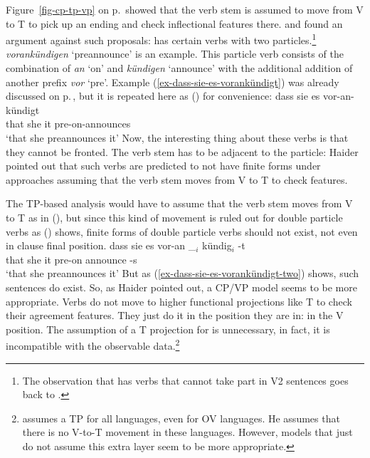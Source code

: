 \largerpage
Figure~\ref{fig-cp-tp-vp} on p.\,\pageref{fig-cp-tp-vp} showed that the verb stem is assumed to move from V to T to
pick up an ending and check inflectional features there. \textcites[]{Haider93a}[--60]{Haider2010a} and \citet[Section~3.3]{Vikner2001a} found an
argument against such proposals:  has certain verbs with two particles.\footnote{%
  The observation that  has verbs that cannot take part in V2 sentences goes back to
  \citet{Hoehle91b}.
} 
\emph{vorankündigen} `preannounce'
is an example. This particle verb consists of the combination of \emph{an} `on' and \emph{kündigen} `announce' with
the additional addition of another prefix \emph{vor} `pre'. Example
(\ref{ex-dass-sie-es-vorankündigt}) was already discussed on
p.\,\pageref{ex-dass-sie-es-vorankündigt}, but it is repeated here as () for convenience:
\ea 
\label{ex-dass-sie-es-vorankündigt-two}
\gll dass sie es vor-an-kündigt\\
     that she it pre-on-announces\\
\glt `that she preannounces it'
\z
Now, the interesting thing about these verbs is that they cannot be fronted. The verb stem has to be
adjacent to the particle:
\eal
{}
\zl
Haider pointed out that such verbs are predicted to not have finite forms under approaches assuming
that the verb stem moves from V to T to check  features.

The TP-based analysis would have to assume that the verb stem  moves from V to T as in (), but
since this kind of movement is ruled out for double particle verbs as () shows, finite forms
of double particle verbs should not exist, not even in clause final position.
\ea 
\gll dass sie es vor-an \_$_i$ kündig$_i$ -t\\
     that she it pre-on {}    announce -s\\
\glt `that she preannounces it'
\z
But as (\ref{ex-dass-sie-es-vorankündigt-two}) shows, such sentences do exist. So, as Haider pointed
out, a CP/VP model seems to be more appropriate. Verbs do not move to higher functional projections
like T to check their agreement features. They just do it in the position they are in: in the V position. The
assumption of a T projection for  is unnecessary, in fact, it is incompatible with the
observable data.\footnote{%
  \citet{Vikner2001a} assumes a TP for all  languages, even for OV languages. He assumes
  that there is no V-to-T movement in these languages. However, models that just do not assume this
  extra layer seem to be more appropriate.
}


